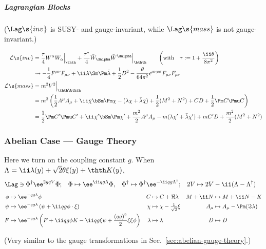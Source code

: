 \subparagraph{Lagrangian Blocks}\vspace{-1.1zw}
\begin{flushright}\footnotesize
 ($\Lag\s{inv}$ is SUSY- and gauge-invariant, while $\Lag\s{mass}$ is not gauge-invariant.)
\end{flushright}\vspace{-14pt}
\begin{align}
 \mathcal L\s{inv}
&= \frac\tau4 W^\alpha W_\alpha\Big|_\thth + \frac{\tau^*}4 \bar W_\dalpha\bar W^\dalpha\Big|_\bthth
 \qquad\left(\text{with}\quad \tau:=1+\frac{\ii\theta}{8\pi^2}\right)\notag\\
&\leadsto -\frac14F^{\mu\nu}F_{\mu\nu}+\ii\lambda\Sm\Pm\bar\lambda + \frac12 D^2
   -\frac{\theta}{64\pi^2}\epsilon^{\mu\nu\rho\sigma}F_{\mu\nu}F_{\rho\sigma}\\
 \mathcal L\s{mass}
&= m^2 V^2\Big|_{\thth\bthth}\notag\\
&= m^2\left(\frac12 A^\mu A_\mu + \ii\bar\chi\bSm\Pm\chi - (\lambda\chi+\bar\lambda\bar\chi) + \frac12(M^2+N^2) + CD + \frac12{\Pm C\Pmu C}\right)\notag\\
&= \frac12{\Pm C'\Pmu C'}+ \ii \bar\chi'\bSm\Pm\chi'
   + \frac{m^2}2 A^\mu A_\mu -  m(\lambda\chi'+\bar\lambda\bar\chi') + mC'D + \frac{m^2}{2}(M^2+N^2)
\end{align}

\subsubsection{Abelian Case --- Gauge Theory}\vspace{-6pt}
Here we turn on the coupling constant $g$. When $\Lambda=\ii\lambda(y)+\sqrt2\theta\xi(y)+\thth K(y)$,
\begin{align}
\Lag&\ni\Phi^\dagger\ee^{2gqV}\Phi;&
 \Phi\mapsto \ee^{\ii qg \Lambda}\Phi,\quad& \Phi^\dagger\mapsto \Phi^\dagger\ee^{-\ii qg \Lambda^\dagger};& 2V&\mapsto 2V-\ii(\Lambda-\Lambda^\dagger)
\end{align}
\begin{align*}
  \phi&\mapsto \ee^{- qg\lambda}\phi&
  C   &\mapsto C+\Re \lambda&
M+\ii N&\mapsto M+\ii N-K
\\
  \psi&\mapsto \ee^{- qg\lambda}\left(\psi+\ii qg\phi\cdot \xi\right)&
  \chi&\mapsto \chi-\tfrac{1}{\sqrt2} \xi&
A_\mu &\mapsto A_\mu- \Pm(\Im\lambda)
\\
  F   &\mapsto \ee^{- qg\lambda}\left(F+\ii qg\phi K-\ii qg \xi\psi +\frac{(qg)^2}{2}\xi\xi\phi\right)&
\lambda&\mapsto\lambda&
D&\mapsto D\\
\end{align*}\vspace{-45pt}
\begin{flushright}
\footnotesize
(Very similar to the gauge transformations in Sec.~\ref{sec:abelian-gauge-theory}.)
\end{flushright}\vspace{-10pt}

